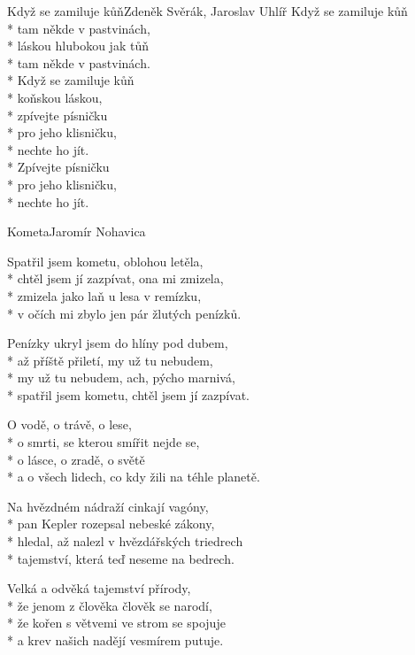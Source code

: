 \documentclass[10.5pt]{book}
\begin{document}
\begin{poem}{Když se zamiluje kůň}{Zdeněk Svěrák, Jaroslav Uhlíř}
Když se zamiluje kůň\\*
tam někde v pastvinách,\\*
láskou hlubokou jak tůň\\*
tam někde v pastvinách.\\*
Když se zamiluje kůň\\*
koňskou láskou,\\*
zpívejte písničku\\*
pro jeho klisničku,\\*
nechte ho jít.\\*
Zpívejte písničku\\*
pro jeho klisničku,\\*
nechte ho jít.

\end{poem}

\begin{poem}{Kometa}{Jaromír Nohavica}

\settowidth{\versewidth}{a o všech lidech, co kdy žili na téhle planetě.}

Spatřil jsem kometu, oblohou letěla,\\*
chtěl jsem jí zazpívat, ona mi zmizela,\\*
zmizela jako laň u lesa v remízku,\\*
v očích mi zbylo jen pár žlutých penízků.

Penízky ukryl jsem do hlíny pod dubem,\\*
až příště přiletí, my už tu nebudem,\\*
my už tu nebudem, ach, pýcho marnivá,\\*
spatřil jsem kometu, chtěl jsem jí zazpívat.

O vodě, o trávě, o lese,\\*
o smrti, se kterou smířit nejde se,\\*
o lásce, o zradě, o světě\\*
a o všech lidech, co kdy žili na téhle planetě.

Na hvězdném nádraží cinkají vagóny,\\*
pan Kepler rozepsal nebeské zákony,\\*
hledal, až nalezl v hvězdářských triedrech\\*
tajemství, která teď neseme na bedrech.

Velká a odvěká tajemství přírody,\\*
že jenom z člověka člověk se narodí,\\*
že kořen s větvemi ve strom se spojuje\\*
a krev našich nadějí vesmírem putuje.


\end{poem}
\end{document}
